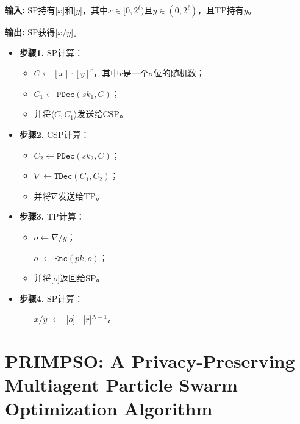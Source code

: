 \textbf{输入:} SP持有[\(x\)]和[\(y\)]，其中\(x\in[0,2^{\ell})\)且\(y\in(0,2^{\ell})\)，且TP持有\(y\)。

\textbf{输出:} SP获得[\(x/y\)]。

\begin{itemize}[leftmargin=*, nosep]
  \item \textbf{步骤1.} SP计算：
    \begin{itemize}[leftmargin=*, nosep]
      \item \(C \leftarrow [x] \cdot [y]^{r}\)，其中\(r\)是一个\(\sigma\)位的随机数；
      \item \(C_{1} \leftarrow \texttt{PDec}(sk_{1}, C)\)；  
      \item 并将\(\langle C, C_{1}\rangle\)发送给CSP。
    \end{itemize}
  
  \item \textbf{步骤2.} CSP计算：
    \begin{itemize}[leftmargin=*, nosep]
      \item \(C_{2} \leftarrow \texttt{PDec}(sk_{2}, C)\)；  
      \item \(\nabla \leftarrow \texttt{TDec}(C_{1}, C_{2})\)；  
      \item 并将\(\nabla\)发送给TP。
    \end{itemize}
  
  \item \textbf{步骤3.} TP计算：
    \begin{itemize}[leftmargin=*, nosep]
      \item \(o \leftarrow \nabla / y\)；  
      \item [\(o\)] \(\leftarrow \texttt{Enc}(pk, o)\)；  
      \item 并将[\(o\)]返回给SP。
    \end{itemize}
  
  \item \textbf{步骤4.} SP计算：
    \begin{itemize}[leftmargin=*, nosep]
      \item [\(x/y\)] \(\leftarrow\) [\(o\)] \(\cdot\) [\(r\)]\({}^{N-1}\)。
    \end{itemize}
\end{itemize}

\clearpage


\section{PRIMPSO: A Privacy-Preserving Multiagent  Particle Swarm Optimization Algorithm}
